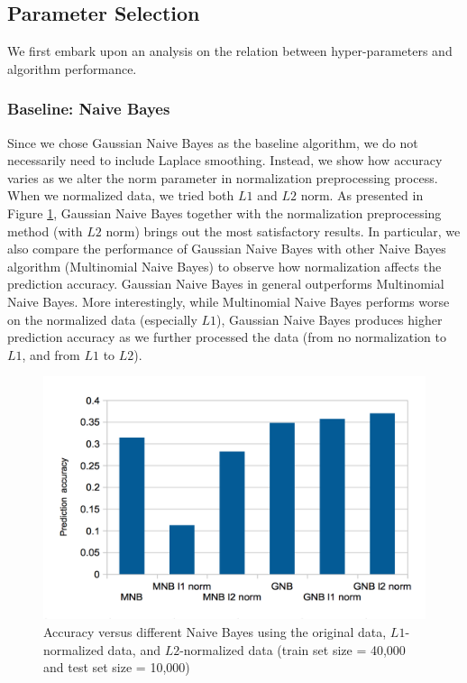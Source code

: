 \documentclass{acm_proc_article-sp}
\begin{document}
\subsection{Parameter Selection}
We first embark upon an analysis on the relation between hyper-parameters and algorithm performance.
 
\subsubsection{Baseline: Naive Bayes}
Since we chose Gaussian Naive Bayes as the baseline algorithm, we do not necessarily need to include Laplace smoothing. Instead, we show how accuracy varies as we alter the norm parameter in normalization preprocessing process. When we normalized data, we tried both $L1$ and $L2$ norm.  As presented in  Figure \ref{fig:gnbparam}, Gaussian Naive Bayes together with the normalization preprocessing method (with $L2$ norm) brings out the most satisfactory results.   In particular, we also compare the performance of Gaussian Naive Bayes with other Naive Bayes algorithm (Multinomial Naive Bayes) to  observe how normalization affects the prediction accuracy. Gaussian Naive Bayes in general outperforms Multinomial Naive Bayes. More interestingly,  while Multinomial Naive Bayes performs worse on the normalized data (especially $L1$),  Gaussian Naive Bayes produces higher prediction accuracy as we further processed the data (from no normalization to $L1$, and from $L1$ to $L2$).
\begin{figure} 
\centering
\includegraphics[width=1\columnwidth]{graphs/gnb_param.png}  
\caption{Accuracy versus different Naive Bayes using the original data, $L1$-normalized data, and $L2$-normalized data (train set size = 40,000 and test set size = 10,000)}
\label{fig:gnbparam}
\end{figure}
\end{document}
